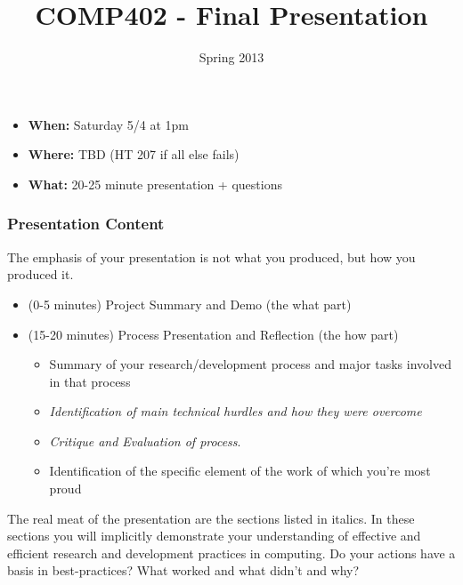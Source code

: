 \documentclass[10pt]{article}
\title{COMP402 - Final Presentation}
\author{}
\date{ Spring 2013}
\begin{document}
\maketitle
\thispagestyle{empty}

\begin{itemize}
\item \textbf{When:} Saturday 5/4 at 1pm
\item \textbf{Where:} TBD (HT 207 if all else fails)
\item \textbf{What:} 20-25 minute presentation + questions 
\end{itemize}

\subsubsection*{Presentation Content}

The emphasis of your presentation is not what you produced, but how you produced it.
\begin{itemize}
\item (0-5 minutes) Project Summary and Demo (the what part)
\item (15-20 minutes) Process Presentation and Reflection (the how part)
\begin{itemize}
\item Summary of your research/development process and major tasks involved in that process
\item \textit{Identification of main technical hurdles and how they were overcome}
\item \textit{Critique and Evaluation of process}. 
\item Identification of the specific element of the work of which you're most proud
\end{itemize}
\end{itemize}
The real meat of the presentation are the sections listed in italics.  In these sections you will implicitly demonstrate your understanding of effective and efficient research and development practices in computing. 
Do your actions have a basis in best-practices? What worked and what didn't and why? 
\end{document}
